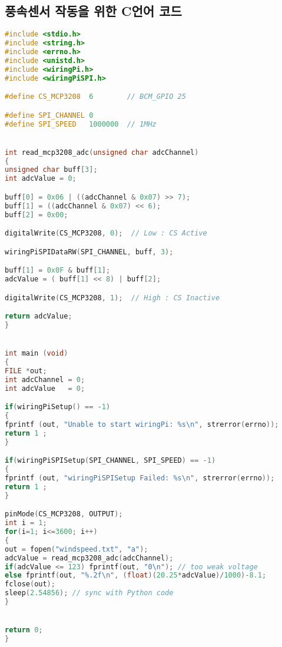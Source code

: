 \subsection{풍속센서 작동을 위한 C언어 코드}


\begin{lstlisting}[language = c++]
#include <stdio.h>
#include <string.h>
#include <errno.h>
#include <unistd.h>
#include <wiringPi.h>
#include <wiringPiSPI.h>

#define CS_MCP3208  6        // BCM_GPIO 25

#define SPI_CHANNEL 0
#define SPI_SPEED   1000000  // 1MHz


int read_mcp3208_adc(unsigned char adcChannel)
{
unsigned char buff[3];
int adcValue = 0;

buff[0] = 0x06 | ((adcChannel & 0x07) >> 7);
buff[1] = ((adcChannel & 0x07) << 6);
buff[2] = 0x00;

digitalWrite(CS_MCP3208, 0);  // Low : CS Active

wiringPiSPIDataRW(SPI_CHANNEL, buff, 3);

buff[1] = 0x0F & buff[1];
adcValue = ( buff[1] << 8) | buff[2];

digitalWrite(CS_MCP3208, 1);  // High : CS Inactive

return adcValue;
}


int main (void)
{
FILE *out;
int adcChannel = 0;
int adcValue   = 0;

if(wiringPiSetup() == -1)
{
fprintf (out, "Unable to start wiringPi: %s\n", strerror(errno));
return 1 ;
}

if(wiringPiSPISetup(SPI_CHANNEL, SPI_SPEED) == -1)
{
fprintf (out, "wiringPiSPISetup Failed: %s\n", strerror(errno));
return 1 ;
}

pinMode(CS_MCP3208, OUTPUT);
int i = 1;
for(i=1; i<=3600; i++)
{
out = fopen("windspeed.txt", "a");
adcValue = read_mcp3208_adc(adcChannel);
if(adcValue <= 123) fprintf(out, "0\n"); // too weak voltage
else fprintf(out, "%.2f\n", (float)(20.25*adcValue)/1000)-8.1;
fclose(out);
sleep(2.54856); // sync with Python code
}


return 0;
}
\end{lstlisting}